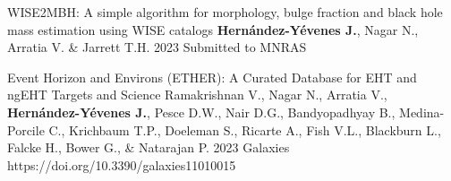 
\begin{cvpublications}{}

	 {WISE2MBH: A simple algorithm for morphology, bulge fraction and black hole mass estimation using WISE catalogs}
	 {\textbf{Hernández-Yévenes J.}, Nagar N., Arratia V. \& Jarrett T.H.}
	 {2023}
     {Submitted to MNRAS}
     {}

	{Event Horizon and Environs (ETHER): A Curated Database for EHT and ngEHT Targets and Science}
	{Ramakrishnan V., Nagar N., Arratia V., \textbf{Hernández-Yévenes J.}, Pesce D.W., Nair D.G., Bandyopadhyay B., Medina-Porcile C.,  Krichbaum T.P., Doeleman S., Ricarte A., Fish V.L., Blackburn L., Falcke H., Bower G., \& Natarajan P.}
    {2023}
	{Galaxies}
    {https://doi.org/10.3390/galaxies11010015}

\end{cvpublications}
